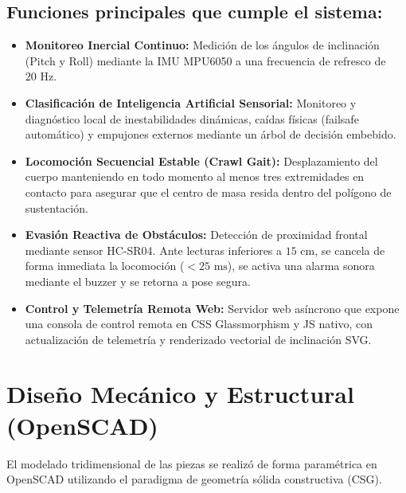 \documentclass[12pt]{article}
\begin{document}
\subsection{Funciones principales que cumple el sistema:}
\begin{itemize}
    \item \textbf{Monitoreo Inercial Continuo:} Medición de los ángulos de inclinación (Pitch y Roll) mediante la IMU MPU6050 a una frecuencia de refresco de $20\text{ Hz}$.
    \item \textbf{Clasificación de Inteligencia Artificial Sensorial:} Monitoreo y diagnóstico local de inestabilidades dinámicas, caídas físicas (failsafe automático) y empujones externos mediante un árbol de decisión embebido.
    \item \textbf{Locomoción Secuencial Estable (Crawl Gait):} Desplazamiento del cuerpo manteniendo en todo momento al menos tres extremidades en contacto para asegurar que el centro de masa resida dentro del polígono de sustentación.
    \item \textbf{Evasión Reactiva de Obstáculos:} Detección de proximidad frontal mediante sensor HC-SR04. Ante lecturas inferiores a $15\text{ cm}$, se cancela de forma inmediata la locomoción ($<25\text{ ms}$), se activa una alarma sonora mediante el buzzer y se retorna a pose segura.
    \item \textbf{Control y Telemetría Remota Web:} Servidor web asíncrono que expone una consola de control remota en CSS Glassmorphism y JS nativo, con actualización de telemetría y renderizado vectorial de inclinación SVG.
\end{itemize}

\newpage

\section{Diseño Mecánico y Estructural (OpenSCAD)}
El modelado tridimensional de las piezas se realizó de forma paramétrica en OpenSCAD utilizando el paradigma de geometría sólida constructiva (CSG).
\end{document}
